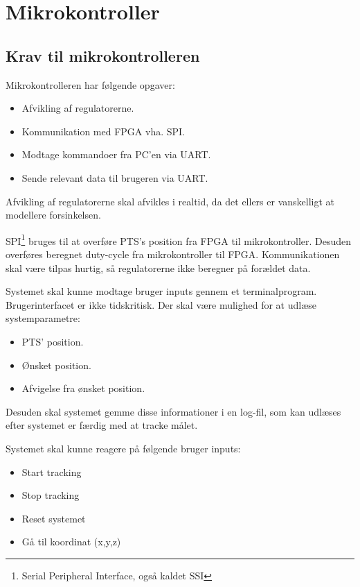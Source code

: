 \section{Mikrokontroller}
\label{sec:mikrokontroller}
\subsection{Krav til mikrokontrolleren}
Mikrokontrolleren har følgende opgaver: 
\todo[inline, author=Michael]{}
\begin{itemize}
	\item Afvikling af regulatorerne.
	\item Kommunikation med FPGA vha. SPI.
	\item Modtage kommandoer fra PC'en via UART.
	\item Sende relevant data til brugeren via UART.
\end{itemize}

Afvikling af regulatorerne skal afvikles i realtid, da det ellers er vanskelligt at modellere forsinkelsen. 


SPI\footnote{Serial Peripheral Interface, også kaldet SSI} bruges til at overføre PTS's position fra FPGA til mikrokontroller. Desuden overføres beregnet duty-cycle fra mikrokontroller til FPGA. Kommunikationen skal være tilpas hurtig, så regulatorerne ikke beregner på forældet data. 

Systemet skal kunne modtage bruger inputs gennem et terminalprogram. Brugerinterfacet er ikke tidskritisk. Der skal være mulighed for at udlæse systemparametre:

\begin{itemize}
	\item PTS' position. 
	\item Ønsket position. 
	\item Afvigelse fra ønsket position. 
\end{itemize}

Desuden skal systemet gemme disse informationer i en log-fil, som kan udlæses efter systemet er færdig med at tracke målet. 

Systemet skal kunne reagere på følgende bruger inputs:


\begin{itemize}
	\item Start tracking
	\item Stop tracking
	\item Reset systemet
	\item Gå til koordinat (x,y,z)
\end{itemize}



